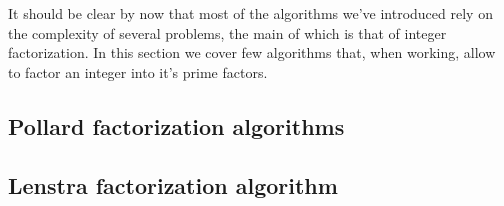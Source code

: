 \documentclass{subfiles}
\begin{document}
    It should be clear  by now that most of the algorithms we've introduced rely on the complexity
        of several problems, the main of which is that of integer factorization.
        In this section we cover few algorithms that, when working\footnotemark,
        allow to factor an integer into it's prime factors.



    \subsection{Pollard factorization algorithms}
    

    \subsection{Lenstra factorization algorithm}
    
\end{document}

